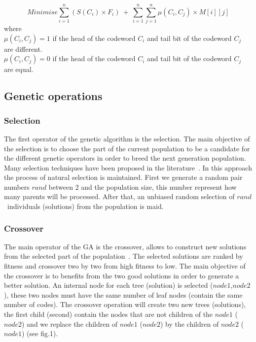 \documentclass[preprint,12pt]{elsarticle}
\begin{document}
\begin{equation}
Minimise \sum_{i=1}^{n} (S(C_{i}) \times F_{i})~+~\sum_{i=1}^{n}\sum_{j=1}^{n} \mu(C_{i},C_{j}) \times M[i][j]  
\end{equation}
where\\
$\mu(C_{i},C_{j})=1$ if the head of the codeword $C_{i}$ and tail bit of the codeword $C_{j}$ are different.\\
$\mu(C_{i},C_{j})=0$ if the head of the codeword $C_{i}$ and tail bit of the codeword $C_{j}$ are equal.


\subsection{Genetic operations}
\subsubsection{Selection}
The first operator of the genetic algorithm is the selection. The main objective of the selection is to choose the part of the current  population to be a candidate for the different genetic operators in order to breed the next generation population. Many selection techniques have been proposed in the literature~\cite{bli95}. In this approach the  process of natural selection is maintained. First we generate a random pair numbers \textit{$rand$} between 2 and the population size, this number represent how many parents will be processed. After that, an unbiased random selection of \textit{$rand$}~individuals (solutions) from the population is maid. 
\subsubsection{Crossover}
The main operator of the GA is the crossover, allows to construct new solutions from the selected part of the population~\cite{osa14}. The selected solutions are ranked by fitness and crossover two by two from high fitness to low. The main objective of the crossover is to benefits from the two good solutions in order to generate a better solution. An internal node for each tree (solution) is selected (\textit{$node1$},\textit{$node2$}), these two nodes must have the same number of leaf nodes (contain the same number of codes). The crossover operation will create two new trees (solutions), the first child (second) contain the nodes that are not children of the \textit{$node1$} (\textit{$node2$}) and we replace the children of \textit{$node1$} (\textit{$node2$}) by the children of \textit{$node2$} (\textit{$node1$}) (see fig.1). 
\end{document}

